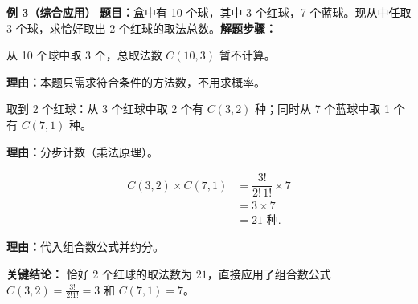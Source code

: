 \begin{examplebox}
	\medskip
	\textbf{\textcolor{CExample}{例 3（综合应用）}}
	\textbf{\textcolor{CExample}{题目：}}盒中有 10 个球，其中 3 个红球，7 个蓝球。现从中任取 3 个球，求恰好取出 2 个红球的取法总数。\textbf{\textcolor{CExample}{解题步骤：}}
	\begin{description}[style=nextline, leftmargin=2.8em, labelsep=0.5em, itemsep=0.45em]
		\item[\textbf{第一步（总取法）：}]
			从 10 个球中取 3 个，总取法数 $C(10,3)$ 暂不计算。
			\par\textbf{理由：}本题只需求符合条件的方法数，不用求概率。
		\item[\textbf{第二步（分类计数）：}]
			取到 2 个红球：从 3 个红球中取 2 个有 $C(3,2)$ 种；同时从 7 个蓝球中取 1 个有 $C(7,1)$ 种。
			\par\textbf{理由：}分步计数（乘法原理）。
		\item[\textbf{第三步（计算数值）：}]
			\[
				\begin{aligned}
					C(3,2)\times C(7,1) &= \dfrac{3!}{2!\,1!}\times 7 \\ &= 3\times 7 \\ &= 21\text{ 种}.
			\end{aligned}
			\]
			\par\textbf{理由：}代入组合数公式并约分。
	\end{description}
	\textbf{\textcolor{CExample}{关键结论：}}
	恰好 2 个红球的取法数为 $21$，直接应用了组合数公式 $C(3,2)=\frac{3!}{2!1!}=3$ 和 $C(7,1)=7$。
\end{examplebox}
